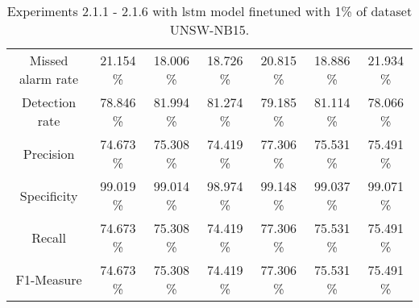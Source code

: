\begin{table}[htb]
\begin{tabular}{@{}ccccccc@{}}
        Missed alarm rate &  21.154 \% &  18.006 \% &  18.726 \% &  20.815 \% &  18.886 \% &  21.934 \% \\
        Detection rate &  78.846 \% &  81.994 \% &  81.274 \% &  79.185 \% &  81.114 \% &  78.066 \% \\
        Precision &  74.673 \% &  75.308 \% &  74.419 \% &  77.306 \% &  75.531 \% &  75.491 \% \\
        Specificity &  99.019 \% &  99.014 \% &  98.974 \% &  99.148 \% &  99.037 \% &  99.071 \% \\
        Recall &  74.673 \% &  75.308 \% &  74.419 \% &  77.306 \% &  75.531 \% &  75.491 \% \\
        F1-Measure &  74.673 \% &  75.308 \% &  74.419 \% &  77.306 \% &  75.531 \% &  75.491 \% \\
        \bottomrule
    \end{tabular}
    \caption{Experiments 2.1.1 - 2.1.6 with \gls{lstm} model finetuned with 1\% of dataset UNSW-NB15.}
    \label{table:results:lstm:flows15_10}
\end{table}